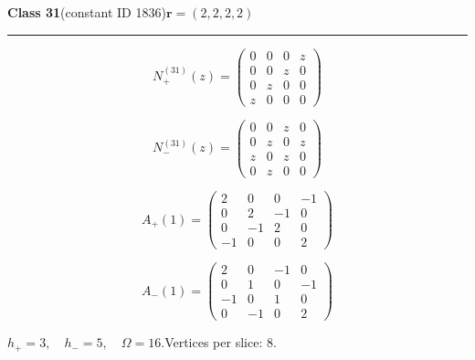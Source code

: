 \noindent\begin{minipage}{\linewidth}
\noindent\textbf{Class 31}\quad\small (constant ID 1836)\hfill $\symbf{r}=(2,2,2,2)$
\par\smallskip\noindent\textcolor{rulegray}{\rule{\linewidth}{0.3pt}}
\begin{minipage}[c]{0.495\linewidth}\centering\fontsize{9.7}{12}\selectfont
\setlength{\abovedisplayskip}{4pt}\setlength{\belowdisplayskip}{4pt}
\setlength{\abovedisplayshortskip}{4pt}\setlength{\belowdisplayshortskip}{4pt}
\setlength{\arraycolsep}{3pt}\renewcommand{\arraystretch}{1.08}
\[N_{+}^{(31)}(z)=\begin{pmatrix}0 & 0 & 0 & z\\0 & 0 & z & 0\\0 & z & 0 & 0\\z & 0 & 0 & 0\end{pmatrix}\]
\end{minipage}%
\begin{minipage}[c]{0.495\linewidth}\centering\fontsize{9.7}{12}\selectfont
\setlength{\abovedisplayskip}{4pt}\setlength{\belowdisplayskip}{4pt}
\setlength{\abovedisplayshortskip}{4pt}\setlength{\belowdisplayshortskip}{4pt}
\setlength{\arraycolsep}{3pt}\renewcommand{\arraystretch}{1.08}
\[N_{-}^{(31)}(z)=\begin{pmatrix}0 & 0 & z & 0\\0 & z & 0 & z\\z & 0 & z & 0\\0 & z & 0 & 0\end{pmatrix}\]
\end{minipage}%
\par\noindent
\begin{minipage}[c]{0.495\linewidth}\centering\fontsize{9.7}{12}\selectfont
\setlength{\abovedisplayskip}{4pt}\setlength{\belowdisplayskip}{4pt}
\setlength{\abovedisplayshortskip}{4pt}\setlength{\belowdisplayshortskip}{4pt}
\setlength{\arraycolsep}{3pt}\renewcommand{\arraystretch}{1.08}
\[A_{+}(1)=\begin{pmatrix}2 & 0 & 0 & -1\\0 & 2 & -1 & 0\\0 & -1 & 2 & 0\\-1 & 0 & 0 & 2\end{pmatrix}\]
\end{minipage}%
\begin{minipage}[c]{0.495\linewidth}\centering\fontsize{9.7}{12}\selectfont
\setlength{\abovedisplayskip}{4pt}\setlength{\belowdisplayskip}{4pt}
\setlength{\abovedisplayshortskip}{4pt}\setlength{\belowdisplayshortskip}{4pt}
\setlength{\arraycolsep}{3pt}\renewcommand{\arraystretch}{1.08}
\[A_{-}(1)=\begin{pmatrix}2 & 0 & -1 & 0\\0 & 1 & 0 & -1\\-1 & 0 & 1 & 0\\0 & -1 & 0 & 2\end{pmatrix}\]
\end{minipage}%
\par\smallskip\noindent\small $h_+=3,\quad h_-=5,\quad \Omega=16.$\quad Vertices per slice: 8.
\end{minipage}\par\vfill

